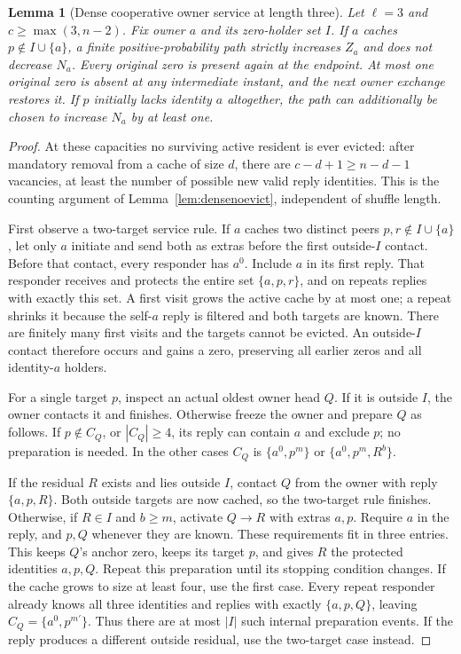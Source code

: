 \documentclass[11pt]{article}
\newtheorem{lemma}[theorem]{Lemma}
\begin{document}
\begin{lemma}[Dense cooperative owner service at length three]
\label{lem:dense3callback}
Let $\ell=3$ and $c\ge\max(3,n-2)$. Fix owner $a$ and its zero-holder
set $I$. If $a$ caches $p\notin I\cup\{a\}$, a finite
positive-probability path strictly increases $Z_a$ and does not
decrease $N_a$. Every original zero is present again at the endpoint.
At most one original zero is absent at any intermediate instant,
and the next owner exchange restores it.
If $p$ initially lacks identity $a$ altogether, the path can additionally
be chosen to increase $N_a$ by at least one.
\end{lemma}
\begin{proof}
At these capacities no surviving active resident is ever evicted:
after mandatory removal from a cache of size $d$, there are
$c-d+1\ge n-d-1$ vacancies, at least the number of possible new valid
reply identities. This is the counting argument of
Lemma~\ref{lem:densenoevict}, independent of shuffle length.

First observe a two-target service rule. If $a$ caches two distinct
peers $p,r\notin I\cup\{a\}$, let only $a$ initiate and send both
as extras before the first outside-$I$ contact.
Before that contact, every responder has $a^0$.
Include $a$ in its first reply. That responder receives and protects
the entire set $\{a,p,r\}$, and on repeats replies with exactly this set.
A first visit grows the active cache by at most one; a repeat shrinks
it because the self-$a$ reply is filtered and both targets are known.
There are finitely many first visits and the targets cannot be evicted.
An outside-$I$ contact therefore occurs and gains a zero, preserving
all earlier zeros and all identity-$a$ holders.

For a single target $p$, inspect an actual oldest owner head $Q$.
If it is outside $I$, the owner contacts it and finishes.
Otherwise freeze the owner and prepare $Q$ as follows.
If $p\notin C_Q$, or $|C_Q|\ge4$, its reply can contain $a$ and
exclude $p$; no preparation is needed.
In the other cases $C_Q$ is $\{a^0,p^m\}$ or
$\{a^0,p^m,R^b\}$.

If the residual $R$ exists and lies outside $I$, contact $Q$
from the owner with reply $\{a,p,R\}$. Both outside targets are now
cached, so the two-target rule finishes.
Otherwise, if $R\in I$ and $b\ge m$, activate $Q\to R$ with extras
$a,p$. Require $a$ in the reply, and $p,Q$ whenever they are known.
These requirements fit in three entries. This keeps $Q$'s anchor
zero, keeps its target $p$, and gives $R$ the protected identities
$a,p,Q$. Repeat this preparation until its stopping condition changes.
If the cache grows to size at least four, use the first case.
Every repeat responder already knows all three identities and
replies with exactly $\{a,p,Q\}$, leaving $C_Q=\{a^0,p^{m'}\}$.
Thus there are at most $|I|$ such internal preparation events.
If the reply produces a different outside residual, use the two-target
case instead.


\end{proof}
\end{document}
